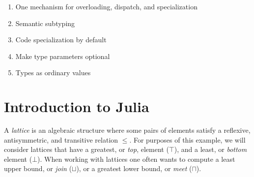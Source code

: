\begin{singlespace}
\begin{enumerate}
\item One mechanism for overloading, dispatch, and specialization
\item Semantic subtyping
\item Code specialization by default
\item Make type parameters optional
\item Types as ordinary values
\end{enumerate}
\end{singlespace}






\iffalse

\section{Introduction to Julia}

A \emph{lattice} is an algebraic structure where some pairs of elements
satisfy a reflexive, antisymmetric, and transitive relation $\leq$.
For purposes of this example, we will consider lattices that have
a greatest, or \emph{top}, element ($\top$), and a least, or \emph{bottom}
element ($\bot$).
When working with lattices one often wants to compute
a least upper bound, or \emph{join} ($\sqcup$), or a greatest lower bound,
or \emph{meet} ($\sqcap$).

